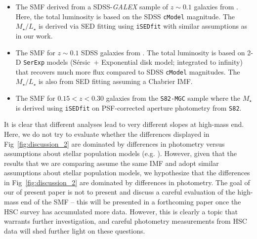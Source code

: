 \documentclass[a4paper,fleqn,usenatbib]{mnras}
\def\ser{{S\'{e}rsic\ }}
\def\cmodel{\texttt{cModel}}
\def\mstar{{$M_{\star}$}}
\def\m2l{{$M_{\star}/L_{\star}$}}
\begin{document}
    \begin{itemize}
    
        \item The SMF derived from a SDSS-\textit{GALEX} sample of $z{\sim} 0.1$ 
            galaxies from \citet{Moustakas13}. 
            Here, the total luminosity is based on the SDSS \cmodel{} magnitude. 
            The \m2l{} is derived via SED fitting using \texttt{iSEDfit} with similar 
            assumptions as in our work.
            
        \item The SMF for $z{\sim} 0.1$ SDSS galaxies from \citet{Bernardi2013}. 
            The total luminosity is based on 2-D \texttt{SerExp} models 
            (\ser{}$+$ Exponential disk model; integrated to infinity) that 
            recovers much more flux compared to SDSS \cmodel{} magnitudes. 
            The \m2l{} is also from SED fitting assuming a Chabrier IMF.
            
        \item The SMF for $0.15 < z < 0.30$ galaxies from the \texttt{S82-MGC} sample
            \citep{Leauthaud2016} where the \mstar{} is derived using 
            \texttt{iSEDfit} on PSF-corrected aperture photometry from 
            \texttt{S82}.
            
    \end{itemize}

    It is clear that different analyses lead to very different slopes at high-mass end. 
    Here, we do not try to evaluate whether the differences displayed in 
    Fig~\ref{fig:discussion_2} are dominated by differences in photometry versus 
    assumptions about stellar population models (e.g. \citealt{Bernardi2016}). 
    However, given that the results that we are comparing assume the same IMF and adopt 
    similar assumptions about stellar population models, we hypothesize that the 
    differences in Fig~\ref{fig:discussion_2} are dominated by differences in photometry. 
    The goal of our of present paper is not to present and discuss a careful evaluation
    of the high-mass end of the SMF -- this will be presented in a forthcoming paper 
    once the HSC survey has accumulated more data. 
    However, this is clearly a topic that warrants further investigation, and careful 
    photometry measurements from HSC data will shed further light on these questions.     
      
\end{document}
